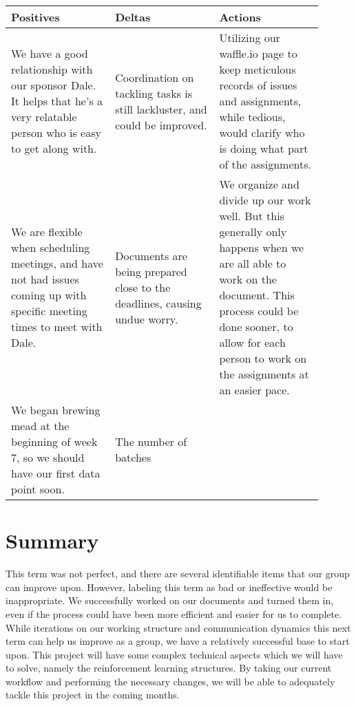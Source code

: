 \documentclass[draftclsnofoot,onecolumn,letterpaper,10pt]{IEEEtran}
\begin{document}
\begin{center}
	\begin{tabular}{p{0.3\linewidth} p{0.3\linewidth} p{0.3\linewidth}}
		\toprule
		\textbf{Positives} & \textbf{Deltas} & \textbf{Actions} \\
		\midrule
		We have a good relationship with our sponsor Dale. It helps that he's a very relatable person who is easy to get along with. & Coordination on tackling tasks is still lackluster, and could be improved. & Utilizing our waffle.io page to keep meticulous records of issues and assignments, while tedious, would clarify who is doing what part of the assignments.\\
		We are flexible when scheduling meetings, and have not had issues coming up with specific meeting times to meet with Dale.& Documents are being prepared close to the deadlines, causing undue worry.& We organize and divide up our work well. But this generally only happens when we are all able to work on the document. This process could be done sooner, to allow for each person to work on the assignments at an easier pace.\\
		We began brewing mead at the beginning of week 7, so we should have our first data point soon. & The number of batches 
		\bottomrule
	\end{tabular}
\end{center}


%
%

\section{Summary}
This term was not perfect, and there are several identifiable items that our group can improve upon.
However, labeling this term as bad or ineffective would be inappropriate.
We successfully worked on our documents and turned them in, even if the process could have been more efficient and easier for us to complete.
While iterations on our working structure and communication dynamics this next term can help us improve as a group, we have a relatively successful base to start upon.
This project will have some complex technical aspects which we will have to solve, namely the reinforcement learning structures.
By taking our current workflow and performing the necessary changes, we will be able to adequately tackle this project in the coming months.
\end{document}

